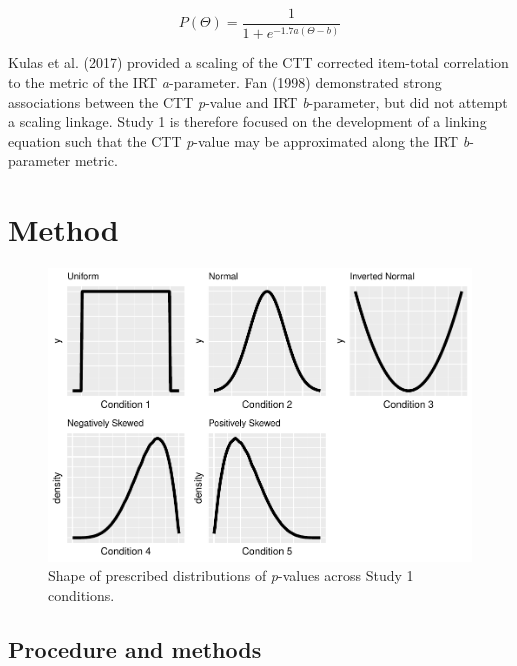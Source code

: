 \documentclass[
  man]{apa6}
\begin{document}
\begin{equation}
P(\Theta)=\frac{1}{1+e^{-1.7a(\Theta-b)}}
\end{equation}

Kulas et al. (2017) provided a scaling of the CTT corrected item-total correlation to the metric of the IRT \emph{a}-parameter. Fan (1998) demonstrated strong associations between the CTT \emph{p}-value and IRT \emph{b}-parameter, but did not attempt a scaling linkage. Study 1 is therefore focused on the development of a linking equation such that the CTT \emph{p}-value may be approximated along the IRT \emph{b}-parameter metric.

\hypertarget{method}{%
\section{Method}\label{method}}

\begin{figure}
\centering
\includegraphics{ICC_project_files/figure-latex/simulatedgraphs-1.pdf}
\caption{\label{fig:simulatedgraphs}Shape of prescribed distributions of \emph{p}-values across Study 1 conditions.}
\end{figure}

\hypertarget{procedure-and-methods}{%
\subsection{Procedure and methods}\label{procedure-and-methods}}
\end{document}
